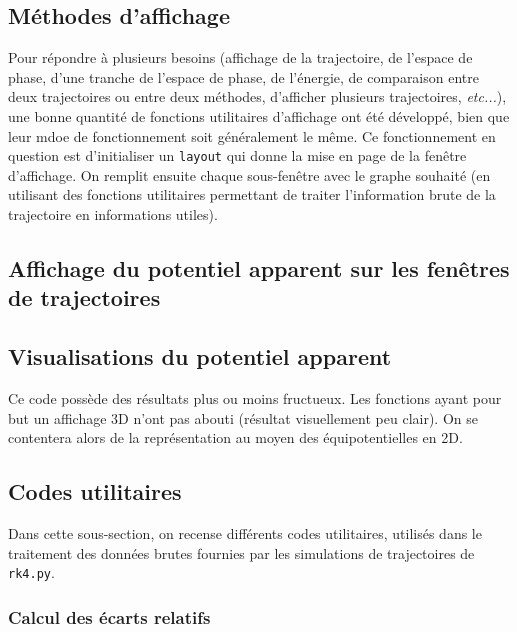 \documentclass[12pt]{article}
\theoremstyle{definition}
\theoremstyle{definition}
\begin{document}
	\subsection{Méthodes d'affichage}
	Pour répondre à plusieurs besoins (affichage de la trajectoire, de l'espace de phase, d'une tranche de l'espace de phase, de l'énergie, de comparaison entre deux trajectoires ou entre deux méthodes, d'afficher plusieurs trajectoires, \textit{etc...}), une bonne quantité de fonctions utilitaires d'affichage ont été développé, bien que leur mdoe de fonctionnement soit généralement le même. Ce fonctionnement en question est d'initialiser un \verb|layout| qui donne la mise en page de la fenêtre d'affichage. On remplit ensuite chaque sous-fenêtre avec le graphe souhaité (en utilisant des fonctions utilitaires permettant de traiter l'information brute de la trajectoire en informations utiles).
	
	
	\clearpage
	\subsection{Affichage du potentiel apparent sur les fenêtres de trajectoires}
	
	
	
	\clearpage
	\subsection{Visualisations du potentiel apparent}
	Ce code possède des résultats plus ou moins fructueux. Les fonctions ayant pour but un affichage 3D n'ont pas abouti (résultat visuellement peu clair). On se contentera alors de la représentation au moyen des équipotentielles en 2D.
	
	
	\clearpage
	\subsection{Codes utilitaires}
	Dans cette sous-section, on recense différents codes utilitaires, utilisés dans le traitement des données brutes fournies par les simulations de trajectoires de \verb|rk4.py|.
	
	\subsubsection{Calcul des écarts relatifs}
	
	
\end{document}
